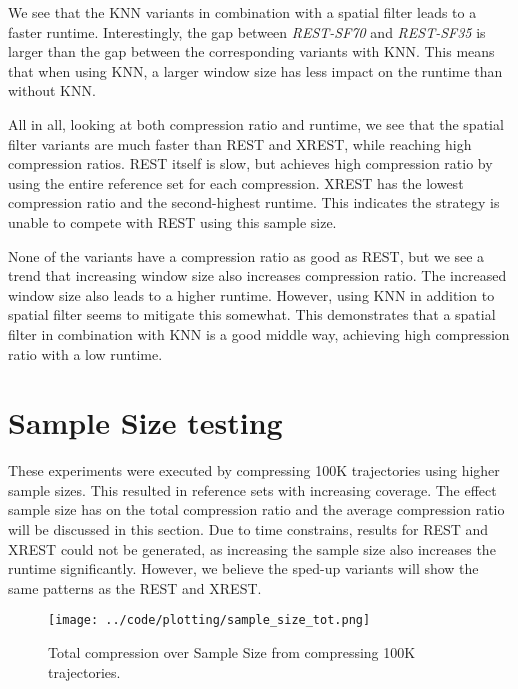 We see that the KNN variants in combination with a spatial filter leads to a faster runtime. Interestingly, the gap between \textit{REST-SF70} and \textit{REST-SF35} is larger than the gap between the corresponding variants with KNN. This means that when using KNN, a larger window size has less impact on the runtime than without KNN.

All in all, looking at both compression ratio and runtime, we see that the spatial filter variants are much faster than REST and XREST, while reaching high compression ratios. REST itself is slow, but achieves high compression ratio by using the entire reference set for each compression. XREST has the lowest compression ratio and the second-highest runtime. This indicates the strategy is unable to compete with REST using this sample size.

None of the variants have a compression ratio as good as REST, but we see a trend that increasing window size also increases compression ratio. The increased window size also leads to a higher runtime. However, using KNN in addition to spatial filter seems to mitigate this somewhat. This demonstrates that a spatial filter in combination with KNN is a good middle way, achieving high compression ratio with a low runtime.

\section{Sample Size testing}\label{sec:sample_size}
These experiments were executed by compressing 100K trajectories using higher sample sizes. This resulted in reference sets with increasing coverage. The effect sample size has on the total compression ratio and the average compression ratio will be discussed in this section. Due to time constrains, results for REST and XREST could not be generated, as increasing the sample size also increases the runtime significantly. However, we believe the sped-up variants will show the same patterns as the REST and XREST.

\begin{figure}[h]
    \begin{minipage}{0.99\linewidth}
        \centering
        \texttt{[image: ../code/plotting/sample\_size\_tot.png]}
        \caption{Total compression over Sample Size from compressing 100K trajectories.}
        \label{fig:sample_tot}
    \end{minipage}
\end{figure}

